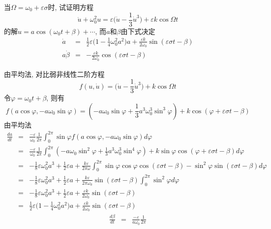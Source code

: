 \begin{problem}[习题7.10]
当$\Omega=\omega_0 + \varepsilon \sigma$时, 试证明方程
\[
\ddot{u} + \omega_0^2 u= \varepsilon\Big(\dot{u} -\frac{1}{3}\dot{u}^3\Big)+\varepsilon k \cos\Omega t
\]
的解$u=a\cos(\omega_0 t +\beta)+\cdots$, 而$a$和$\beta$由下式决定
\begin{eqnarray}
\displaystyle \dot{a} &=& \frac{1}{2}\varepsilon \Big(1-\frac{1}{4}\omega_0^2a^2\Big)a + \frac{\varepsilon k}{2\omega_0} \sin(\varepsilon\sigma t - \beta)\nonumber\\
\displaystyle a\dot{\beta} &=& -\frac{\varepsilon k}{2\omega_0}\cos(\varepsilon\sigma t-\beta)\nonumber
\end{eqnarray}
\end{problem}

\begin{solution}
由平均法, 对比弱非线性二阶方程
\[
f(u,\dot{u}) = \Big(\dot{u} -\frac{1}{3}\dot{u}^3\Big)+k \cos\Omega t
\]
令$\varphi=\omega_0 t+\beta$, 则有
\[
f(a\cos\varphi, -a\omega_0\sin\varphi) = (-a\omega_0\sin\varphi + \frac{1}{3}a^3\omega_0^3\sin^3\varphi) + k\cos(\varphi+\varepsilon\sigma t -\beta)
\]
由平均法
\begin{eqnarray}
\frac{da}{dt}&=&\frac{-\varepsilon}{\omega_0}\frac{1}{2\pi}
\int_0^{2\pi}\sin\varphi f(a\cos\varphi, -a\omega_0\sin\varphi) d\varphi\nonumber\\
&=&\frac{-\varepsilon}{\omega_0}\frac{1}{2\pi}
\int_0^{2\pi}(-a\omega_0\sin^2\varphi + \frac{1}{3}a^3\omega_0^3\sin^4\varphi) + k\sin\varphi\cos(\varphi+\varepsilon\sigma t -\beta)d\varphi\nonumber\\
&=&-\frac{1}{8}\varepsilon\omega_0^2a^3 + \frac{1}{2}\varepsilon a +
\frac{k\varepsilon}{2\pi\omega}\int_0^{2\pi}
\sin\varphi\cos\varphi\cos(\varepsilon\sigma t-\beta) - \sin^2\varphi\sin(\varepsilon\sigma t-\beta)
d\varphi\nonumber\\
&=&-\frac{1}{8}\varepsilon\omega_0^2a^3 + \frac{1}{2}\varepsilon a + \frac{k\varepsilon}{2\pi\omega_0}\sin(\varepsilon\sigma t-\beta)\int_0^{2\pi}\sin^2\varphi
d\varphi\nonumber\\
&=&-\frac{1}{8}\varepsilon\omega_0^2a^3 + \frac{1}{2}\varepsilon a +\frac{\varepsilon k}{2\omega_0}\sin(\varepsilon\sigma t-\beta)\nonumber\\
&=& \frac{1}{2}\varepsilon \Big(1-\frac{1}{4}\omega_0^2a^2\Big)a + \frac{\varepsilon k}{2\omega_0} \sin(\varepsilon\sigma t - \beta)\nonumber
\end{eqnarray}
\begin{eqnarray}
\frac{d\beta}{dt}&=&\frac{-\varepsilon}{a\omega_0}\frac{1}{2\pi}

\end{eqnarray}
\end{solution}
